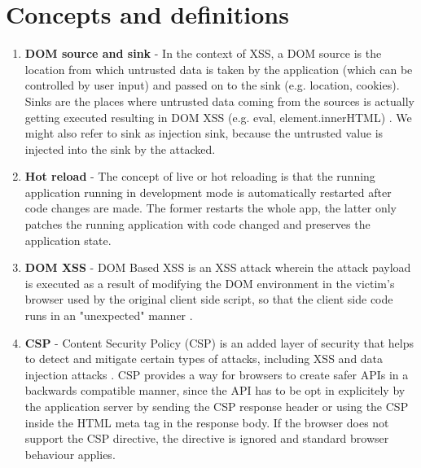 \chapter*{Concepts and definitions} %
\label{definitions}

\begin{enumerate}
  \item \label{def:dom_source_sink} \textbf{DOM source and sink} - In the context of XSS, a DOM
        source is the location from which untrusted data is taken by the application (which can be
        controlled by user input) and passed on to the sink (e.g. location, cookies). Sinks are the
        places where untrusted data coming from the sources is actually getting executed resulting
        in DOM XSS (e.g. eval, element.innerHTML) \cite{source_sink_definition}. We might also refer
        to sink as injection sink, because the untrusted value is injected into the sink by the
        attacked.
  \item \label{def:hot_reload} \textbf{Hot reload} - The concept of live or hot reloading is that
        the running application running in development mode is automatically restarted after code
        changes are made. The former restarts the whole app, the latter only patches the running
        application with code changed and preserves the application state.
  \item \label{def:dom_xss} \textbf{DOM XSS} - DOM Based XSS is an XSS attack wherein the attack
        payload is executed as a result of modifying the DOM environment in the victim's browser
        used by the original client side script, so that the client side code runs in an
        "unexpected" manner \cite{owasp_dom_xss_def}.
  \item \label{def:csp} \textbf{CSP} - Content Security Policy (CSP) is an added layer of security
        that helps to detect and mitigate certain types of attacks, including XSS and data injection
        attacks \cite{mdn_csp_def}. CSP provides a way for browsers to create safer APIs in a
        backwards compatible manner, since the API has to be opt in explicitely by the application
        server by sending the CSP response header or using the CSP inside the HTML meta tag in the
        response body. If the browser does not support the CSP directive, the directive is ignored
        and standard browser behaviour applies.
\end{enumerate}
